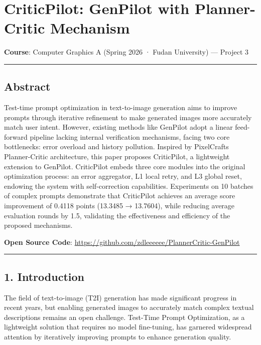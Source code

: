 \documentclass[
]{article}
\author{}
\date{}
\begin{document}
\section{CriticPilot: GenPilot with Planner-Critic
Mechanism}\label{criticpilot-genpilot-with-planner-critic-mechanism}

\textbf{Course}: Computer Graphics A (Spring 2026 · Fudan University)
--- Project 3

\begin{center}\rule{0.5\linewidth}{0.5pt}\end{center}

\subsection{Abstract}\label{abstract}

Test-time prompt optimization in text-to-image generation aims to
improve prompts through iterative refinement to make generated images
more accurately match user intent. However, existing methods like
GenPilot adopt a linear feed-forward pipeline lacking internal
verification mechanisms, facing two core bottlenecks: error overload and
history pollution. Inspired by PixelCraft\textquotesingle s
Planner-Critic architecture, this paper proposes CriticPilot, a
lightweight extension to GenPilot. CriticPilot embeds three core modules
into the original optimization process: an error aggregator, L1 local
retry, and L3 global reset, endowing the system with self-correction
capabilities. Experiments on 10 batches of complex prompts demonstrate
that CriticPilot achieves an average score improvement of 0.4118 points
(13.3485 → 13.7604), while reducing average evaluation rounds by 1.5,
validating the effectiveness and efficiency of the proposed mechanisms.

\textbf{Open Source Code}:
\url{https://github.com/zdleeeeee/PlannerCritic-GenPilot}

\begin{center}\rule{0.5\linewidth}{0.5pt}\end{center}

\subsection{1. Introduction}\label{1-introduction}

The field of text-to-image (T2I) generation has made significant
progress in recent years, but enabling generated images to accurately
match complex textual descriptions remains an open challenge. Test-Time
Prompt Optimization, as a lightweight solution that requires no model
fine-tuning, has garnered widespread attention by iteratively improving
prompts to enhance generation quality.
\end{document}
